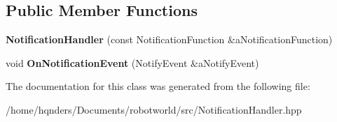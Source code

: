 \subsection*{Public Member Functions}
\begin{DoxyCompactItemize}
\item 
{\bfseries Notification\+Handler} (const Notification\+Function \&a\+Notification\+Function)\hypertarget{class_base_1_1_notification_handler_afcd3ef66adda7297131dc6abdef0122e}{}\label{class_base_1_1_notification_handler_afcd3ef66adda7297131dc6abdef0122e}

\item 
void {\bfseries On\+Notification\+Event} (Notify\+Event \&a\+Notify\+Event)\hypertarget{class_base_1_1_notification_handler_a1071e6455f5e96e93f1b6645f7d9bcde}{}\label{class_base_1_1_notification_handler_a1071e6455f5e96e93f1b6645f7d9bcde}

\end{DoxyCompactItemize}


The documentation for this class was generated from the following file\+:\begin{DoxyCompactItemize}
\item 
/home/hqnders/\+Documents/robotworld/src/Notification\+Handler.\+hpp\end{DoxyCompactItemize}
